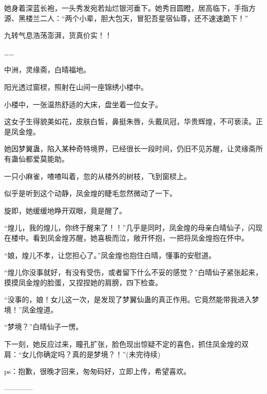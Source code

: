 \begin{this_body}
她身着深蓝长袍，一头秀发宛若灿烂银河垂下。她秀目圆瞪，居高临下，手指方源、黑楼兰二人：“两个小辈，胆大包天，冒犯吾星宿仙尊，还不速速跪下！”

九转气息浩荡澎湃，货真价实！！

……

中洲，灵缘斋，白晴福地。

阳光透过窗棂，照射在山间一座锦绣小楼中。

小楼中，一张温热舒适的大床，盘坐着一位女子。

这女子生得貌美如花，皮肤白皙，鼻挺朱唇，头戴凤冠，华贵辉煌，不可亵渎。正是凤金煌。

她因梦翼蛊，陷入某种奇特境界，已经很长一段时间，仍旧不见苏醒，让灵缘斋所有蛊仙都爱莫能助。

一只小麻雀，喳喳叫着，忽的从楼外的树枝，飞到窗棂上。

似乎是听到这个动静，凤金煌的睫毛忽然微动了一下。

旋即，她缓缓地睁开双眼，竟是醒了。

“煌儿，我的煌儿，你终于醒来了！！”几乎是同时，凤金煌的母亲白晴仙子，闪现在楼中。看到凤金煌苏醒，她喜极而泣，敞开怀抱，一把将凤金煌抱在怀中。

“娘，煌儿不孝，让您担心了。”凤金煌也抱住白晴，懂事的安慰道。

“煌儿你没事就好，有没有受伤，或者留下什么不妥的感觉？”白晴仙子紧张起来，摸摸凤金煌的脸蛋，又捏捏她的肩膀，四下检查。

“没事的，娘！女儿这一次，是发现了梦翼仙蛊的真正作用。它竟然能带我进入梦境！”凤金煌道。

“梦境？”白晴仙子一愣。

下一刻，她反应过来，瞳孔扩张，脸色现出惊疑不定的喜色，抓住凤金煌的双肩：“女儿你确定吗？真的是梦境？！”(未完待续)

ps：抱歉，很晚才回来，匆匆码好，立即上传，希望喜欢。

------------

\end{this_body}

